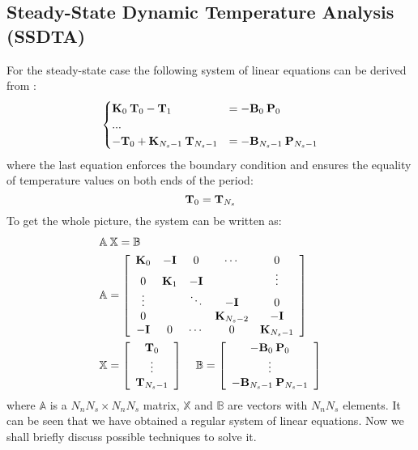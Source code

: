 \subsection{Steady-State Dynamic Temperature Analysis (SSDTA)} \label{sec:ssdta-analytical}
For the steady-state case the following system of linear equations can be derived from :
\[
  \begin{cases}
    \mathbf{K}_0 \: \mathbf{T}_0 - \mathbf{T}_1 & = -\mathbf{B}_0 \: \mathbf{P}_0 \\
    ... \\
    -\mathbf{T}_0 + \mathbf{K}_{N_s - 1} \: \mathbf{T}_{N_s - 1} & = -\mathbf{B}_{N_s - 1} \: \mathbf{P}_{N_s - 1}
  \end{cases}
\]
where the last equation enforces the boundary condition and ensures the equality of temperature values on both ends of the period:
\begin{equation} \label{eq:boundary-condition}
  \mathbf{T}_0 = \mathbf{T}_{N_s}
\end{equation}
To get the whole picture, the system can be written as:
\begin{align}
  & \mathbb{A} \: \mathbb{X} = \mathbb{B} \label{eq:system} \\
  & \mathbb{A} = \left[
    \begin{array}{ccccc}
      \mathbf{K}_0 & -\mathbf{I} & 0 & \cdots & 0 \\
      0 & \mathbf{K}_1 & -\mathbf{I} &  & \vdots \\
      \vdots &  & \ddots & -\mathbf{I} & 0 \\
      0 &  &  & \mathbf{K}_{N_s - 2} & -\mathbf{I} \\
      -\mathbf{I} & 0 & \cdots & 0 & \mathbf{K}_{N_s - 1}
    \end{array}
  \right] \nonumber \\
  & \mathbb{X} = \left[
    \begin{array}{c}
      \mathbf{T}_0 \\
      \vdots \\
      \mathbf{T}_{N_s - 1}
    \end{array}
  \right] \; \; \; \; \mathbb{B} = \left[
    \begin{array}{c}
      -\mathbf{B}_0 \: \mathbf{P}_0 \\
      \vdots \\
      -\mathbf{B}_{N_s - 1} \: \mathbf{P}_{N_s - 1}
    \end{array}
  \right] \nonumber
\end{align}
where $\mathbb{A}$ is a $N_n N_s \times N_n N_s$ matrix, $\mathbb{X}$ and $\mathbb{B}$ are vectors with $N_n N_s$ elements. It can be seen that we have obtained a regular system of linear equations. Now we shall briefly discuss possible techniques to solve it.






